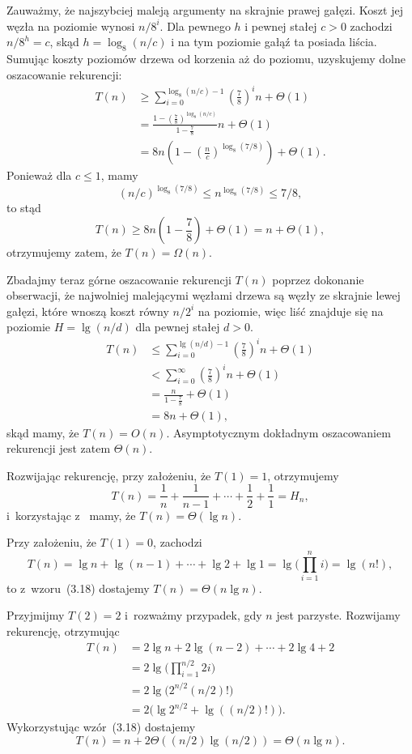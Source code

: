Zauważmy, że najszybciej maleją argumenty na skrajnie prawej gałęzi. Koszt jej węzła na  poziomie wynosi $n/8^i$. Dla pewnego $h$ i pewnej stałej $c>0$ zachodzi $n/8^h=c$, skąd $h=\log_8(n/c)$ i na tym poziomie gałąź ta posiada liścia. Sumując koszty poziomów drzewa od korzenia aż do  poziomu, uzyskujemy dolne oszacowanie rekurencji:
\begin{align*}
	T(n) &\ge \sum_{i=0}^{\log_8(n/c)-1}\left(\frac{7}{8}\right)^in+\Theta(1) \\
	&= \frac{1-\left(\frac{7}{8}\right)^{\log_8(n/c)}}{1-\frac{7}{8}}n+\Theta(1) \\
	&= 8n\left(1-\left(\frac{n}{c}\right)^{\log_8(7/8)}\right)+\Theta(1).
\end{align*}
Ponieważ dla $c\le1$, mamy
\[
    (n/c)^{\log_8(7/8)} \le n^{\log_8(7/8)} \le 7/8,
\]
to stąd
\[
    T(n) \ge 8n\left(1-\frac{7}{8}\right)+\Theta(1) = n+\Theta(1),
\]
otrzymujemy zatem, że $T(n)=\Omega(n)$.

Zbadajmy teraz górne oszacowanie rekurencji $T(n)$ poprzez dokonanie obserwacji, że najwolniej malejącymi węzłami drzewa są węzły ze skrajnie lewej gałęzi, które wnoszą koszt równy $n/2^i$ na  poziomie, więc liść znajduje się na poziomie $H=\lg(n/d)$ dla pewnej stałej $d>0$.
\begin{align*}
	T(n) &\le \sum_{i=0}^{\lg(n/d)-1}\left(\frac{7}{8}\right)^in+\Theta(1) \\
	&< \sum_{i=0}^\infty\left(\frac{7}{8}\right)^in+\Theta(1) \\
	&= \frac{n}{1-\frac{7}{8}}+\Theta(1) \\
	&= 8n+\Theta(1),
\end{align*}
skąd mamy, że $T(n)=O(n)$. Asymptotycznym dokładnym oszacowaniem rekurencji jest zatem $\Theta(n)$.

\subproblem %
Rozwijając rekurencję, przy założeniu, że $T(1)=1$, otrzymujemy
\[
	T(n) = \frac{1}{n}+\frac{1}{n-1}+\cdots+\frac{1}{2}+\frac{1}{1} = H_n,
\]
i~korzystając z~ mamy, że $T(n)=\Theta(\lg n)$.

\subproblem %
Przy założeniu, że $T(1)=0$, zachodzi
\[
	T(n) = \lg n+\lg(n-1)+\cdots+\lg2+\lg 1 = \lg\biggl(\prod_{i=1}^ni\biggr) = \lg(n!),
\]
to z~wzoru~(3.18) dostajemy $T(n)=\Theta(n\lg n)$.

\subproblem %
Przyjmijmy $T(2)=2$ i~rozważmy przypadek, gdy $n$ jest parzyste. Rozwijamy rekurencję, otrzymując
\begin{align*}
	T(n) &= 2\lg n+2\lg(n-2)+\cdots+2\lg4+2 \\
	&= 2\lg\biggl(\prod_{i=1}^{n/2}2i\biggr) \\
	&= 2\lg\bigl(2^{n/2}(n/2)!\bigr) \\
	&= 2\bigl(\lg 2^{n/2}+\lg((n/2)!)\bigr).
\end{align*}
Wykorzystując wzór~(3.18) dostajemy
\[
	T(n) = n+2\Theta((n/2)\lg (n/2)) = \Theta(n\lg n).
\]

